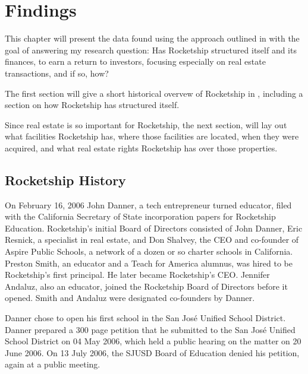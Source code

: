 
\chapter{Findings}\label{ch:findings}\noindent
\bigskip%

This chapter will present the data found using the approach outlined in  with the goal of answering my research question: Has Rocketship structured itself and its finances, to earn a return to investors, focusing especially on real estate transactions, and if so, how?

The first section will give a short historical overvew of Rocketship in , including a section on how Rocketship has structured itself. 

Since real estate is so important for Rocketship, the next section,  will lay out what facilities Rocketship has, where those facilities are located, when they were acquired, and what real estate rights Rocketship has over those properties.

\section{Rocketship History}\label{sec:history}\indent

On February 16, 2006 John Danner, a tech entrepreneur turned educator, filed with the California Secretary of State incorporation papers for Rocketship Education. Rocketship's initial Board of Directors consisted of John Danner, Eric Resnick, a specialist in real estate, and Don Shalvey, the CEO and co-founder of Aspire Public Schools, a network of a dozen or so charter schools in California. Preston Smith, an educator and a Teach for America alumnus, was hired to be Rocketship's first principal. He later became Rocketship's CEO. Jennifer Andaluz, also an educator, joined the Rocketship Board of Directors before it opened. Smith and Andaluz were designated co-founders by Danner.

Danner chose to open his first school in the San José Unified School District. Danner prepared a 300 page petition that he submitted to the San José Unified School District on 04 May 2006, which held a public hearing on the matter on 20 June 2006. On 13 July 2006, the SJUSD Board of Education denied his petition, again at a public meeting.

